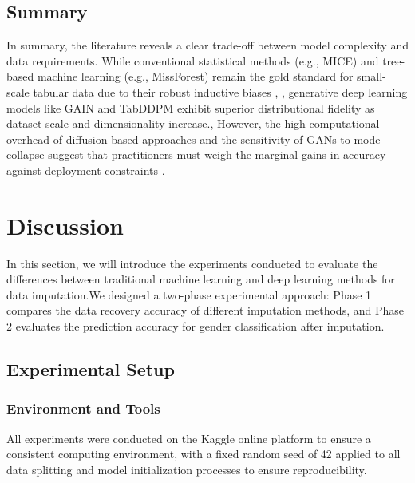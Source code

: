\documentclass[twocolumn, 9pt]{extarticle}
\begin{document}
 \subsection{Summary}
In summary, the literature reveals a clear trade-off between model complexity and data requirements. While conventional statistical methods (e.g., MICE) and tree-based machine learning (e.g., MissForest) remain the gold standard for small-scale tabular data due to their robust inductive biases \cite{Grinsztajn2022}, \cite{beyazit2023}, generative deep learning models like GAIN and TabDDPM exhibit superior distributional fidelity as dataset scale and dimensionality increase.\cite{sun2023deep},\cite{Kotelnikov2023} However, the high computational overhead of diffusion-based approaches and the sensitivity of GANs to mode collapse suggest that practitioners must weigh the marginal gains in accuracy against deployment constraints \cite{Bertsimas2018}.





\section{Discussion}
In this section, we will introduce the experiments conducted to evaluate the differences between traditional machine learning and deep learning methods for data imputation.We designed a two-phase experimental approach: Phase 1 compares the data recovery accuracy of different imputation methods, and Phase 2 evaluates the prediction accuracy for gender classification after imputation.

\subsection{Experimental Setup} 
\subsubsection{Environment and Tools}
All experiments were conducted on the Kaggle online platform to ensure a consistent computing environment, with a fixed random seed of 42 applied to all data splitting and model initialization processes to ensure reproducibility.
\end{document}
